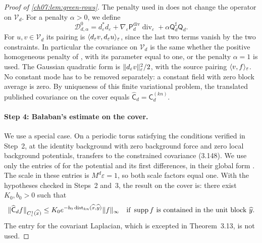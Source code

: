 \begin{proof}[Proof of \cref{ch07:lem:green-rows}]
The penalty used in \cite{Balaban1985Background} does not change the operator on $\mathcal V_d$. For a penalty $\alpha>0$, we define
\[
 \mathscr D_{d,\alpha}^0=d_\varepsilon^*d_\varepsilon+\nabla_\varepsilon\mathsf P_d^{\mathrm{div}}\operatorname{div}_\varepsilon+\alpha\mathsf Q_d^\sharp\mathsf Q_d.
\]
For $u,v\in\mathcal V_d$ its pairing is $\langle d_\varepsilon v,d_\varepsilon u\rangle_\varepsilon$, since the last two terms vanish by the two constraints. In particular the covariance on $\mathcal V_d$ is the same whether the positive homogeneous penalty of \cite{Balaban1985Background}, with its parameter equal to one, or the penalty $\alpha=1$ is used. The Gaussian quadratic form is $\lVert d_\varepsilon v\rVert_\varepsilon^2/2$, with the source pairing $\langle v,f\rangle_\varepsilon$. No constant mode has to be removed separately: a constant field with zero block average is zero. By uniqueness of this finite variational problem, the translated published covariance on the cover equals $\widehat{\mathsf C}_d=\mathsf C_d^{(kn)}$.

\paragraph{Step 4: Ba{\l}aban's estimate on the cover.}
We use a special case. On a periodic torus satisfying the conditions verified in Step~2, at the identity background with zero background force and zero local background potentials, \cite[Theorem~3.13, p.~426]{Balaban1985Background} transfers \cite[Theorem~3.3, p.~399]{Balaban1985Background} to the constrained covariance (3.148). We use only the entries of \cite[(3.42), p.~397]{Balaban1985Background} for the potential and its first differences, in their global form \cite[(3.47), p.~398]{Balaban1985Background}. The scale in these entries is $M^d\varepsilon=1$, so both scale factors equal one. With the hypotheses checked in Steps~2 and~3, the result on the cover is: there exist $K_0,b_0>0$ such that
\begin{equation}\label{ch07:eq:cover-green-block}
 \lVert \widehat{\mathsf C}_df\rVert_{C^1_\varepsilon(\widehat x)}
 \le K_0e^{-b_0\operatorname{dist}_{kn}(\widehat x,\widehat y)}\lVert f\rVert_\infty
 \quad\text{if }\operatorname{supp} f\text{ is contained in the unit block }\widehat y .
\end{equation}
The entry for the covariant Laplacian, which is excepted in Theorem~3.13, is not used.


\end{proof}
